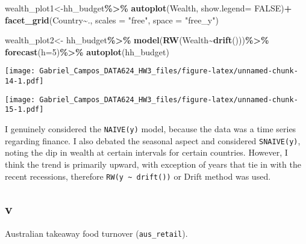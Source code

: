 \documentclass[
]{article}
\newenvironment{Shaded}{\begin{snugshade}}{\end{snugshade}}
\newcommand{\AttributeTok}[1]{\textcolor[rgb]{0.13,0.29,0.53}{#1}}
\newcommand{\ConstantTok}[1]{\textcolor[rgb]{0.56,0.35,0.01}{#1}}
\newcommand{\DecValTok}[1]{\textcolor[rgb]{0.00,0.00,0.81}{#1}}
\newcommand{\FunctionTok}[1]{\textcolor[rgb]{0.13,0.29,0.53}{\textbf{#1}}}
\newcommand{\NormalTok}[1]{#1}
\newcommand{\OtherTok}[1]{\textcolor[rgb]{0.56,0.35,0.01}{#1}}
\newcommand{\SpecialCharTok}[1]{\textcolor[rgb]{0.81,0.36,0.00}{\textbf{#1}}}
\newcommand{\StringTok}[1]{\textcolor[rgb]{0.31,0.60,0.02}{#1}}
\begin{document}
\begin{Shaded}
\begin{Highlighting}[]
\NormalTok{wealth\_plot1}\OtherTok{\textless{}{-}}\NormalTok{hh\_budget}\SpecialCharTok{\%\textgreater{}\%}
                \FunctionTok{autoplot}\NormalTok{(Wealth, }\AttributeTok{show.legend=} \ConstantTok{FALSE}\NormalTok{)}\SpecialCharTok{+}
                  \FunctionTok{facet\_grid}\NormalTok{(Country}\SpecialCharTok{\textasciitilde{}}\NormalTok{., }\AttributeTok{scales =} \StringTok{"free"}\NormalTok{, }\AttributeTok{space =} \StringTok{"free\_y"}\NormalTok{)}

\NormalTok{wealth\_plot2}\OtherTok{\textless{}{-}}\NormalTok{ hh\_budget}\SpecialCharTok{\%\textgreater{}\%}
                \FunctionTok{model}\NormalTok{(}\FunctionTok{RW}\NormalTok{(Wealth}\SpecialCharTok{\textasciitilde{}}\FunctionTok{drift}\NormalTok{()))}\SpecialCharTok{\%\textgreater{}\%}
                  \FunctionTok{forecast}\NormalTok{(}\AttributeTok{h=}\DecValTok{5}\NormalTok{)}\SpecialCharTok{\%\textgreater{}\%}
                    \FunctionTok{autoplot}\NormalTok{(hh\_budget)}
\end{Highlighting}
\end{Shaded}

\texttt{[image: Gabriel\_Campos\_DATA624\_HW3\_files/figure-latex/unnamed-chunk-14-1.pdf]}

\texttt{[image: Gabriel\_Campos\_DATA624\_HW3\_files/figure-latex/unnamed-chunk-15-1.pdf]}

I genuinely considered the \texttt{NAIVE(y)} model, because the data was
a time series regarding finance. I also debated the seasonal aspect and
considered \texttt{SNAIVE(y)}, noting the dip in wealth at certain
intervals for certain countries. However, I think the trend is primarily
upward, with exception of years that tie in with the recent recessions,
therefore \texttt{RW(y\ \textasciitilde{}\ drift())} or Drift method was
used.

\hypertarget{v}{%
\subsection{v}\label{v}}

Australian takeaway food turnover (\texttt{aus\_retail}).

\begin{Shaded}
\end{Shaded}
\end{document}

